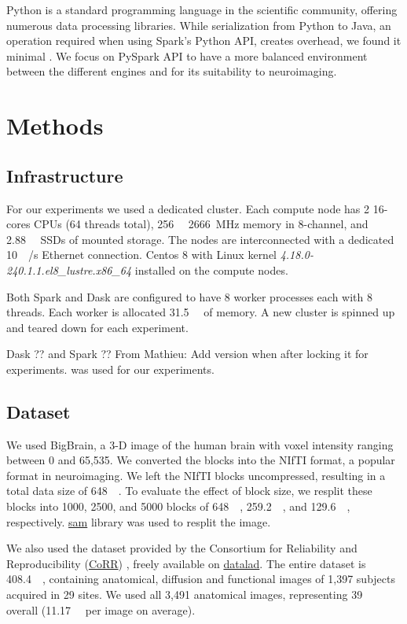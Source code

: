 \documentclass[conference]{IEEEtran}
\newcommand{\MD}[1]{\color{magenta}From Mathieu: #1 \color{black}}
\begin{document}
Python is a standard programming language in the scientific community, offering numerous data processing libraries.
While serialization from Python to Java, an operation required when using Spark's Python API, creates overhead, we found it minimal \cite{8943502}.
We focus on PySpark API to have a more balanced environment between the different engines and for its suitability to neuroimaging.

\section{Methods}
\subsection{Infrastructure}
For our experiments we used a dedicated cluster.
Each compute node has 2 16-cores CPUs (64 threads total),
\SI{256}{\giga\byte} \SI{2666}{\mega\hertz} memory in 8-channel,
and \SI{2.88}{\tera\byte} SSDs of mounted storage.
The nodes are interconnected with a dedicated \SI{10}{\giga\bit/\second} Ethernet connection.
Centos 8 with Linux kernel \textit{4.18.0-240.1.1.el8\_lustre.x86\_64} installed on the compute nodes.

Both Spark and Dask are configured to have 8 worker processes each with 8 threads.
Each worker is allocated \SI{31.5}{\giga\byte} of memory.
A new cluster is spinned up and teared down for each experiment.

Dask ?? and Spark ?? \MD{Add version when after locking it for experiments.} was used for our experiments.

\subsection{Dataset}
We used BigBrain\cite{Amunts:13}, a 3-D image of the human brain with voxel intensity ranging between 0 and 65,535.
We converted the blocks into the NIfTI format, a popular format in neuroimaging.
We left the NIfTI blocks uncompressed, resulting in a total data size of \SI{648}{\giga\byte}.
To evaluate the effect of block size, we resplit these blocks into 1000, 2500, and 5000 blocks of \SI{648}{\mega\byte}, \SI{259.2}{\mega\byte}, and \SI{129.6}{\mega\byte}, respectively.
\href{https://github.com/big-data-lab-team/sam}{sam} library was used to resplit the image.
	
We also used the dataset provided by the Consortium for Reliability and Reproducibility (\href{http://fcon_1000.projects.nitrc.org/indi/CoRR/html/}{CoRR}) \cite{zuo2014open}, freely available on \href{https://datasets.datalad.org/?dir=/corr/RawDataBIDS}{datalad}.
The entire dataset is \SI{408.4}{\giga\byte}, containing anatomical, diffusion and functional images of 1,397 subjects acquired in 29 sites.
We used all 3,491 anatomical images, representing \SI{39}{\giga\byte} overall (\SI{11.17}{\mega\byte} per image on average).
	
\end{document}
